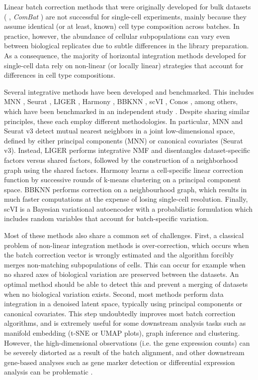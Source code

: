 Linear batch correction methods that were originally developed for bulk datasets ( \cite{Ritchie2015}, \textit{ComBat} \cite{Johnson2006}) are not successful for single-cell experiments, mainly because they assume identical (or at least, known) cell type composition across batches. In practice, however, the abundance of cellular subpopulations can vary even between biological replicates due to subtle differences in the library preparation. As a consequence, the majority of horizontal integration methods developed for single-cell data rely on non-linear (or locally linear) strategies that account for differences in cell type compositions.

Several integrative methods have been developed and benchmarked. This includes MNN \cite{Haghverdi2018}, Seurat \cite{Butler2018}, LIGER \cite{Welch2019}, Harmony \cite{Korsunsky2019}, BBKNN \cite{Polanski2019}, scVI \cite{Lopez2018}, Conos \cite{Barkas2019}, among others, which have been benchmarked in an independent study \cite{Luecken2020}. Despite sharing similar principles, these each employ different methodologies. In particular, MNN and Seurat v3 detect mutual nearest neighbors in a joint low-dimensional space, defined by either principal components (MNN) or canonical covariates (Seurat v3). Instead, LIGER performs integrative NMF and disentangles dataset-specific factors versus shared factors, followed by the construction of a neighborhood graph using the shared factors. Harmony learns a cell-specific linear correction function by successive rounds of k-means clustering on a principal component space. BBKNN performs correction on a neighbourhood graph, which results in much faster computations at the expense of losing single-cell resolution. Finally, scVI is a Bayesian variational autoencoder with a probabilistic formulation which includes random variables that account for batch-specific variation.

Most of these methods also share a common set of challenges. First, a classical problem of non-linear integration methods is over-correction, which occurs when the batch correction vector is wrongly estimated and the algorithm forcibly merges non-matching subpopulations of cells. This can occur for example when no shared axes of biological variation are preserved between the datasets. An optimal method should be able to detect this and prevent a merging of datasets when no biological variation exists. Second, most methods perform data integration in a denoised latent space, typically using principal components or canonical covariates. This step undoubtedly improves most batch correction algorithms, and is extremely useful for some downstream analysis tasks such as manifold embedding (t-SNE or UMAP plots), graph inference and clustering. However, the high-dimensional observations (i.e. the gene expression counts) can be severely distorted as a result of the batch alignment, and other downstream gene-based analyses such as gene marker detection or differential expression analysis can be problematic \cite{Haghverdi2018}.

